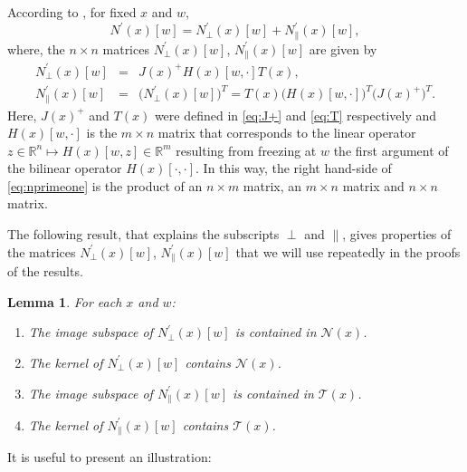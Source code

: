 \documentclass[10pt]{article}
\newcommand{\Npperp}{N^\prime_\perp}
\newcommand{\Nppar}{N^\prime_\|}
\newcommand{\bbR}{\mathbb R}
\newtheorem{lemma}[proposition]{Lemma}
\begin{document}
According to \cite{GP}, for fixed \(x\) and \(w\),
\begin{equation}\label{eq:Nprime}
N^\prime(x)[w] = \Npperp(x)[w]+\Nppar(x)[w],
\end{equation}
where, the \(n\times n\) matrices \(\Npperp(x)[w]\), \(\Nppar(x)[w]\) are given by
\begin{eqnarray}\label{eq:nprimeone}
\Npperp(x)[w] &=& J(x)^+ H(x)[w,\cdot] T(x),\\\label{eq:nprimetwo}
\Nppar(x)[w]   &= & \big(N^\prime_\perp(x)[w]\big)^T = T(x)\big(H(x)[w,\cdot] \big)^T \big(J(x)^+\big)^T.
\end{eqnarray}
Here, \(J(x)^+\) and \(T(x)\) were defined in \eqref{eq:J+} and \eqref{eq:T} respectively and \(H(x)[w,\cdot]\) is the \(m\times n\) matrix that corresponds to the linear operator \(z\in\bbR^n\mapsto H(x)[w,z]\in\bbR^m\) resulting from freezing at \(w\) the first argument of the bilinear operator \(H(x)[\cdot,\cdot]\). In this way, the right hand-side of \eqref{eq:nprimeone} is the product of an \(n\times m\) matrix, an \(m\times n\) matrix and \(n\times n\) matrix.

The following result, that explains the subscripts \(\perp\) and \(\|\), gives  properties of the matrices \(\Npperp(x)[w]\), \(\Nppar(x)[w]\) that we will use repeatedly in the proofs of the results.

\begin{lemma}
\label{lemma:nprime}For each \(x\) and \(w\):
\begin{enumerate}
\item The image subspace of \(\Npperp(x)[w]\) is contained in \({\mathcal N}(x)\).
\item The kernel of \(\Npperp(x)[w]\) contains \({\mathcal N}(x)\).
\item The image subspace of \(\Nppar(x)[w]\) is contained in \({\mathcal T}(x)\).
\item The kernel of \(\Nppar(x)[w]\) contains \({\mathcal T}(x)\).
\end{enumerate}
\end{lemma}


It is useful to present an illustration:
\end{document}
